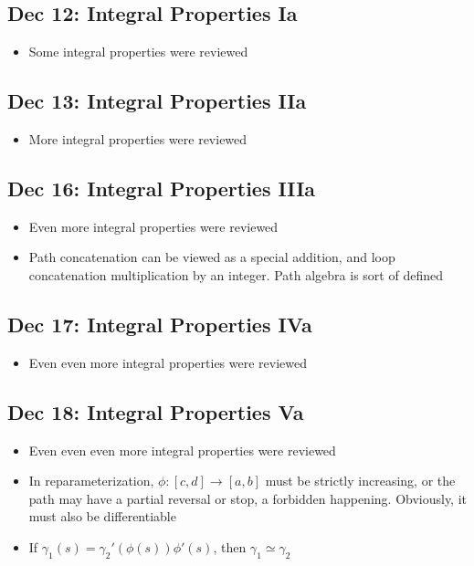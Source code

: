 \documentclass[10pt, oneside]{article}
\begin{document}
\subsection{Dec 12: Integral Properties Ia}
\begin{itemize}
    \item Some integral properties were reviewed
\end{itemize}

\subsection{Dec 13: Integral Properties IIa}
\begin{itemize}
    \item More integral properties were reviewed
\end{itemize}

\subsection{Dec 16: Integral Properties IIIa}
\begin{itemize}
    \item Even more integral properties were reviewed
    \item Path concatenation can be viewed as a special addition, and loop concatenation multiplication by an integer. Path algebra is sort of defined
\end{itemize}

\subsection{Dec 17: Integral Properties IVa}
\begin{itemize}
    \item Even even more integral properties were reviewed
\end{itemize}

\subsection{Dec 18: Integral Properties Va}
\begin{itemize}
    \item Even even even more integral properties were reviewed
    \item In reparameterization, $\phi: [c,d] \rightarrow [a,b]$ must be strictly increasing, or the path may have a partial reversal or stop, a forbidden happening. Obviously, it must also be differentiable
    \item If $\gamma_1(s) = \gamma_2'(\phi(s))\phi'(s)$, then $\gamma_1 \simeq \gamma_2$
\end{itemize}
\end{document}
